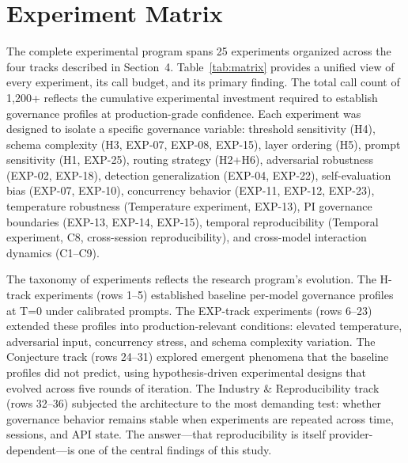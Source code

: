 \documentclass[11pt,a4paper]{article}
\begin{document}
\section{Experiment Matrix}

The complete experimental program spans 25 experiments organized across the four tracks described in Section~4. Table~\ref{tab:matrix} provides a unified view of every experiment, its call budget, and its primary finding. The total call count of 1,200+ reflects the cumulative experimental investment required to establish governance profiles at production-grade confidence. Each experiment was designed to isolate a specific governance variable: threshold sensitivity (H4), schema complexity (H3, EXP-07, EXP-08, EXP-15), layer ordering (H5), prompt sensitivity (H1, EXP-25), routing strategy (H2+H6), adversarial robustness (EXP-02, EXP-18), detection generalization (EXP-04, EXP-22), self-evaluation bias (EXP-07, EXP-10), concurrency behavior (EXP-11, EXP-12, EXP-23), temperature robustness (Temperature experiment, EXP-13), PI governance boundaries (EXP-13, EXP-14, EXP-15), temporal reproducibility (Temporal experiment, C8, cross-session reproducibility), and cross-model interaction dynamics (C1--C9).

The taxonomy of experiments reflects the research program's evolution. The H-track experiments (rows 1--5) established baseline per-model governance profiles at T=0 under calibrated prompts. The EXP-track experiments (rows 6--23) extended these profiles into production-relevant conditions: elevated temperature, adversarial input, concurrency stress, and schema complexity variation. The Conjecture track (rows 24--31) explored emergent phenomena that the baseline profiles did not predict, using hypothesis-driven experimental designs that evolved across five rounds of iteration. The Industry \& Reproducibility track (rows 32--36) subjected the architecture to the most demanding test: whether governance behavior remains stable when experiments are repeated across time, sessions, and API state. The answer---that reproducibility is itself provider-dependent---is one of the central findings of this study.
\end{document}
